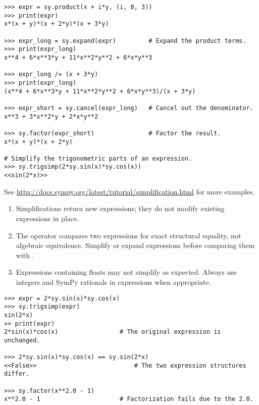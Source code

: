 \begin{lstlisting}
>>> expr = sy.product(x + i*y, (i, 0, 3))
>>> print(expr)
x*(x + y)*(x + 2*y)*(x + 3*y)

>>> expr_long = sy.expand(expr)         # Expand the product terms.
>>> print(expr_long)
x**4 + 6*x**3*y + 11*x**2*y**2 + 6*x*y**3

>>> expr_long /= (x + 3*y)
>>> print(expr_long)
(x**4 + 6*x**3*y + 11*x**2*y**2 + 6*x*y**3)/(x + 3*y)

>>> expr_short = sy.cancel(expr_long)   # Cancel out the denominator.
x**3 + 3*x**2*y + 2*x*y**2

>>> sy.factor(expr_short)               # Factor the result.
x*(x + y)*(x + 2*y)

# Simplify the trigonometric parts of an expression.
>>> sy.trigsimp(2*sy.sin(x)*sy.cos(x))
<<sin(2*x)>>
\end{lstlisting}

See \url{http://docs.sympy.org/latest/tutorial/simplification.html} for more examples.

\begin{warn}
\begin{enumerate}
\item Simplifications return new expressions; they do not modify existing expressions in place.

\item The \li{==} operator compares two expressions for exact structural equality, not algebraic equivalence.
Simplify or expand expressions before comparing them with \li{==}.

\item Expressions containing floats may not simplify as expected.
Always use integers and SymPy rationals in expressions when appropriate.
\end{enumerate}

\begin{lstlisting}
>>> expr = 2*sy.sin(x)*sy.cos(x)
>>> sy.trigsimp(expr)
sin(2*x)
>> print(expr)
2*sin(x)*cos(x)                 # The original expression is unchanged.

>>> 2*sy.sin(x)*sy.cos(x) == sy.sin(2*x)
<<False>>                           # The two expression structures differ.

>>> sy.factor(x**2.0 - 1)
x**2.0 - 1                      # Factorization fails due to the 2.0.
\end{lstlisting}
\end{warn}

